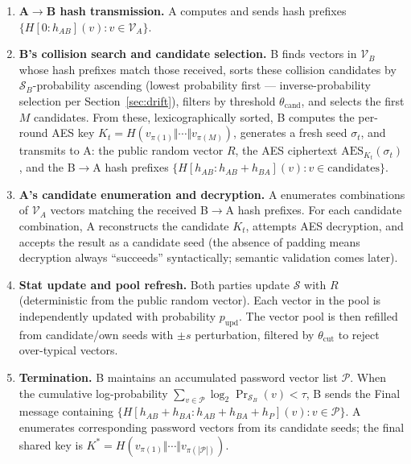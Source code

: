 \documentclass[11pt,a4paper]{article}
\begin{document}
\begin{enumerate}[leftmargin=*]
\item \textbf{A$\to$B hash transmission.} A computes and sends hash prefixes $\{H[0{:}h_{AB}](v) : v \in \mathcal{V}_A\}$.

\item \textbf{B's collision search and candidate selection.} B finds vectors in $\mathcal{V}_B$ whose hash prefixes match those received, sorts these collision candidates by $\mathcal{S}_B$-probability ascending (lowest probability first --- inverse-probability selection per Section~\ref{sec:drift}), filters by threshold $\theta_{\text{cand}}$, and selects the first $M$ candidates. From these, lexicographically sorted, B computes the per-round AES key $K_t = H(v_{\pi(1)} \Vert \cdots \Vert v_{\pi(M)})$, generates a fresh seed $\sigma_t$, and transmits to A: the public random vector $R$, the AES ciphertext $\mathrm{AES}_{K_t}(\sigma_t)$, and the B$\to$A hash prefixes $\{H[h_{AB}{:}h_{AB}+h_{BA}](v) : v \in \text{candidates}\}$.

\item \textbf{A's candidate enumeration and decryption.} A enumerates combinations of $\mathcal{V}_A$ vectors matching the received B$\to$A hash prefixes. For each candidate combination, A reconstructs the candidate $K_t$, attempts AES decryption, and accepts the result as a candidate seed (the absence of padding means decryption always ``succeeds'' syntactically; semantic validation comes later).

\item \textbf{Stat update and pool refresh.} Both parties update $\mathcal{S}$ with $R$ (deterministic from the public random vector). Each vector in the pool is independently updated with probability $p_\text{upd}$. The vector pool is then refilled from candidate/own seeds with $\pm s$ perturbation, filtered by $\theta_{\text{cut}}$ to reject over-typical vectors.

\item \textbf{Termination.} B maintains an accumulated password vector list $\mathcal{P}$. When the cumulative log-probability $\sum_{v \in \mathcal{P}} \log_2 \Pr_{\mathcal{S}_B}(v) < \tau$, B sends the Final message containing $\{H[h_{AB}+h_{BA}{:}h_{AB}+h_{BA}+h_P](v) : v \in \mathcal{P}\}$. A enumerates corresponding password vectors from its candidate seeds; the final shared key is $K^* = H(v_{\pi(1)} \Vert \cdots \Vert v_{\pi(|\mathcal{P}|)})$.
\end{enumerate}
\end{document}
